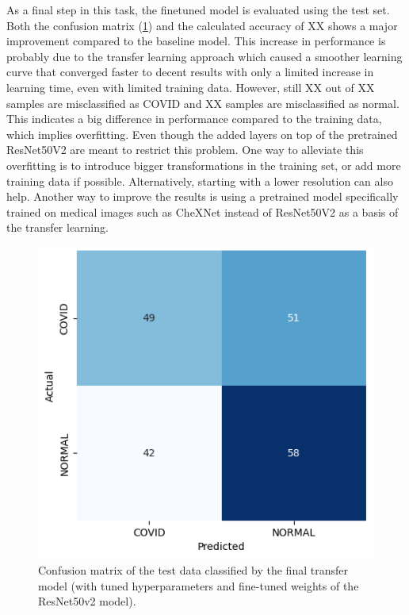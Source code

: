 \documentclass[conference]{IEEEtran}
\begin{document}
As a final step in this task, the finetuned model is evaluated using the test set. Both the confusion matrix (\ref{fig:task3_confusionmatrix}) and the calculated accuracy of XX shows a major improvement compared to the baseline model. 
This increase in performance is probably due to the transfer learning approach which caused a smoother learning curve that converged faster to decent results with only a limited increase in learning time, even with limited training data. 
However, still XX out of XX samples are misclassified as COVID and XX samples are misclassified as normal.
This indicates a big difference in performance compared to the training data, which implies overfitting. Even though the added layers on top of the pretrained ResNet50V2 are meant to restrict this problem. 
One way to alleviate this overfitting is to introduce bigger transformations in the training set, or add more training data if possible. Alternatively, starting with a lower resolution can also help.
Another way to improve the results is using a pretrained model specifically trained on medical images such as CheXNet instead of ResNet50V2 as a basis of the transfer learning.

\begin{figure}[h] \centering \includegraphics[width=0.9\columnwidth]{fig_task3_confusionmatrix.png} \caption{Confusion matrix of the test data classified by the final transfer model (with tuned hyperparameters and fine-tuned weights of the ResNet50v2 model).} \label{fig:task3_confusionmatrix} 
\end{figure}
\end{document}
